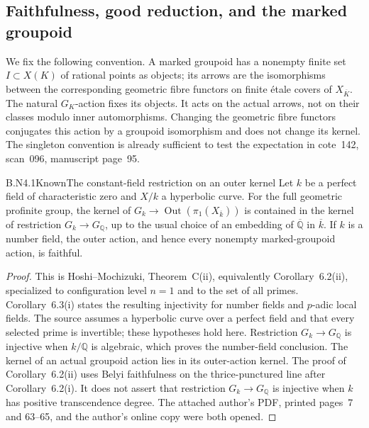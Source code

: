 \subsection{Faithfulness, good reduction, and the marked groupoid}

We fix the following convention.  A marked groupoid has a nonempty finite
set $I\subset X(K)$ of rational points as objects; its arrows are the
isomorphisms between the corresponding geometric fibre functors on finite
\'etale covers of $X_{\overline K}$.  The natural $G_K$-action fixes its
objects.  It acts on the actual arrows, not on their classes modulo inner
automorphisms.  Changing the geometric fibre functors conjugates this
action by a groupoid isomorphism and does not change its kernel.  The
singleton convention is already sufficient to test the expectation in
cote~142, scan~096, manuscript page~95.

\begin{claim}{B.N4.1}{Known}{The constant-field restriction on an outer kernel}
Let $k$ be a perfect field of characteristic zero and $X/k$ a hyperbolic
curve.  For the full geometric profinite group, the kernel of
$G_k\to\operatorname{Out}(\pi_1(X_{\overline k}))$ is contained in the
kernel of restriction $G_k\to G_{\mathbb Q}$, up to the usual choice of
an embedding of $\overline{\mathbb Q}$ in $\overline k$.  If $k$ is a
number field, the outer action, and hence every nonempty marked-groupoid
action, is faithful.
\end{claim}
\begin{proof}
This is Hoshi--Mochizuki, Theorem~C(ii), equivalently Corollary~6.2(ii),
specialized to configuration level $n=1$ and to the set of all primes.
Corollary~6.3(i) states the resulting injectivity for number fields and
$p$-adic local fields.  The source assumes a hyperbolic curve over a
perfect field and that every selected prime is invertible; these
hypotheses hold here.  Restriction $G_k\to G_{\mathbb Q}$ is injective
when $k/\mathbb Q$ is algebraic, which proves the number-field conclusion.
The kernel of an actual groupoid action lies in its outer-action kernel.
The proof of Corollary~6.2(ii) uses Belyi faithfulness on the
thrice-punctured line after Corollary~6.2(i).  It does not assert that
restriction $G_k\to G_{\mathbb Q}$ is injective when $k$ has positive
transcendence degree.  The attached author's PDF, printed pages~7 and
63--65, and the author's online copy were both opened.
\end{proof}

